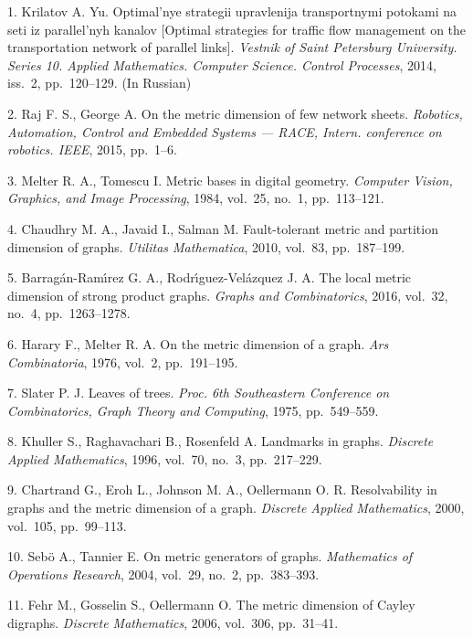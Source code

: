 

{\footnotesize

\vskip 3mm


\vskip 2mm

1. Krilatov A. Yu. Optimal'nye strategii upravlenija transportnymi
potokami na seti iz parallel'nyh kanalov [Optimal strategies for
traffic flow management on the transportation network of parallel
links]. {\it Vestnik of Saint Petersburg University. Series 10.
Applied Mathematics. Computer Science. Control Processes}, 2014,
iss.~2, pp.~120--129. (In Russian)

2. Raj F. S., George A. On the metric dimension of few network
sheets. {\it Robotics, Automation, Control and Embedded Systems
--- RACE, Intern. conference on robotics. IEEE}, 2015, pp.~1--6.

3. Melter R. A., Tomescu I. Metric bases in digital geometry. {\it
Computer Vision, Graphics, and Image Processing}, 1984, vol.~25,
no.~1, pp.~113--121.

4. Chaudhry M. A., Javaid I., Salman M. Fault-tolerant metric and
partition dimension of graphs. {\it Utilitas Mathematica}, 2010,
vol.~83, pp.~187--199.

5. Barrag\'an-Ram\'{\i}rez G. A., Rodr\'{\i}guez-Vel\'azquez J. A.
The local metric dimension of strong product graphs. {\it Graphs
and Combinatorics}, 2016, vol.~32, no.~4, pp.~1263--1278.

6. Harary F., Melter R. A. On the metric dimension of a graph.
{\it Ars Combinatoria}, 1976, vol.~2, pp.~191--195.

7. Slater P. J. Leaves of trees. {\it Proc. 6th Southeastern
Conference on Combinatorics, Graph Theory and Computing}, 1975,
pp.~549--559.

8. Khuller S., Raghavachari B., Rosenfeld A. Landmarks in graphs.
{\it Discrete Applied Mathematics}, 1996, vol.~70, no.~3,
pp.~217--229.

9. Chartrand G., Eroh L., Johnson M. A., Oellermann O. R.
Resolvability in graphs and the metric dimension of a graph. {\it
Discrete Applied Mathematics}, 2000, vol.~105, pp.~99--113.

10. Seb{\"o} A., Tannier E. On metric generators of graphs. {\it
Mathematics of Operations Research}, 2004, vol.~29, no.~2,
pp.~383--393.

11. Fehr M., Gosselin S., Oellermann O. The metric dimension of
Cayley digraphs. {\it Discrete Mathematics}, 2006, vol.~306,
pp.~31--41.

}
